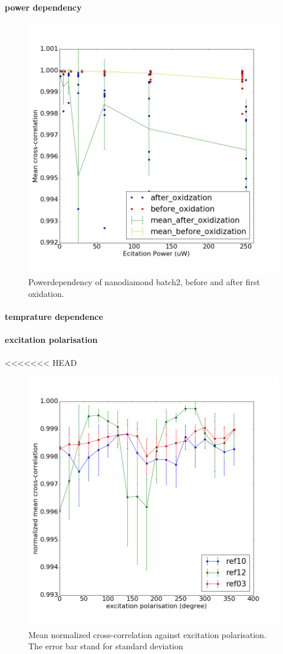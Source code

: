 \paragraph{power dependency}
\begin{figure}[h]
\centering
\includegraphics[width=0.7\linewidth]{Figures/pic/powerdependencybeforeafteroxidation}
\caption{Powerdependency of nanodiamond batch2, before and after first oxidation.}
\label{fig:powerdependencybeforeafteroxidation}
\end{figure}

\paragraph{temprature dependence}



\paragraph{excitation polarisation}


<<<<<<< HEAD
\begin{figure}[h]
\centering
\includegraphics[width=0.7\linewidth]{"Figures/pic/excitation polarisation"}
\caption{Mean normalized cross-correlation against excitation polarisation. The error bar stand for standard deviation}
\label{fig:excitation-polarisation of untreated nanodiamond batch 2}
\end{figure}

